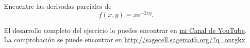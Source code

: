 % 
% 
% 



\begin{problema}
	Encuentre las derivadas parciales de 
	$$
	f(x,y)=xe^{-2xy}.
	$$
\end{problema}

El desarrollo completo del ejercicio lo puedes encontrar en \href{https://www.youtube.com/watch?v=2_wPr3Qnyd8&list=PLblwZNylw7eHCfUFZF-cc-kLIR-wzwWNi&index=8}{mi Canal de YouTube}. La comprobaci\'on se puede encontrar en \href{http://sagecell.sagemath.org/?z=eJwrSyzSUK_QqVTX5OVK06jQUajUVLBVqNBKrSjQ0DXSqtCqBElUAGUqNW0V0vRSMtOAykBilWAxBbggSGFxRn65RloFnFWpCQD8XBsP&lang=sage}{http://sagecell.sagemath.org/?q=onrgkx}


% 
% 
% 
% 
% 
% 


